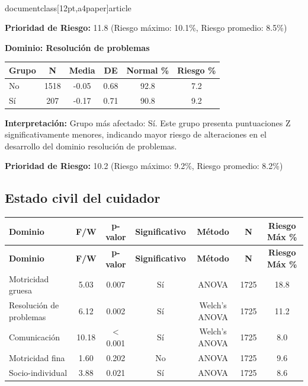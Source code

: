 \\documentclass[12pt,a4paper]{article}
\begin{document}
\textbf{Prioridad de Riesgo:} 11.8 (Riesgo máximo: 10.1\%, Riesgo promedio: 8.5\%)


\vspace{0.5cm}


\textbf{Dominio: Resolución de problemas}


\begin{center}
\begin{tabular}{|l|c|c|c|c|c|}
\hline
\textbf{Grupo} & \textbf{N} & \textbf{Media} & \textbf{DE} & \textbf{Normal \%} & \textbf{Riesgo \%} \\
\hline
No & 1518 & -0.05 & 0.68 & 92.8 & 7.2 \\
Sí & 207 & -0.17 & 0.71 & 90.8 & 9.2 \\

\hline
\end{tabular}
\end{center}


\textbf{Interpretación:} Grupo más afectado: Sí. Este grupo presenta puntuaciones Z significativamente menores, indicando mayor riesgo de alteraciones en el desarrollo del dominio resolución de problemas.

\textbf{Prioridad de Riesgo:} 10.2 (Riesgo máximo: 9.2\%, Riesgo promedio: 8.2\%)


\vspace{0.5cm}


\subsection{Estado civil del cuidador}


\begin{longtable}{|l|c|c|c|c|c|c|}
\hline
\textbf{Dominio} & \textbf{F/W} & \textbf{p-valor} & \textbf{Significativo} & \textbf{Método} & \textbf{N} & \textbf{Riesgo Máx \%} \\
\hline
\endfirsthead

\hline
\textbf{Dominio} & \textbf{F/W} & \textbf{p-valor} & \textbf{Significativo} & \textbf{Método} & \textbf{N} & \textbf{Riesgo Máx \%} \\
\hline
\endhead

\hline
\endfoot

\hline
\endlastfoot

Motricidad gruesa & 5.03 & 0.007 & Sí & ANOVA & 1725 & 18.8 \\
Resolución de problemas & 6.12 & 0.002 & Sí & Welch's ANOVA & 1725 & 11.2 \\
Comunicación & 10.18 & < 0.001 & Sí & Welch's ANOVA & 1725 & 8.0 \\
Motricidad fina & 1.60 & 0.202 & No & ANOVA & 1725 & 9.6 \\
Socio-individual & 3.88 & 0.021 & Sí & ANOVA & 1725 & 8.6 \\

\end{longtable}
\end{document}
